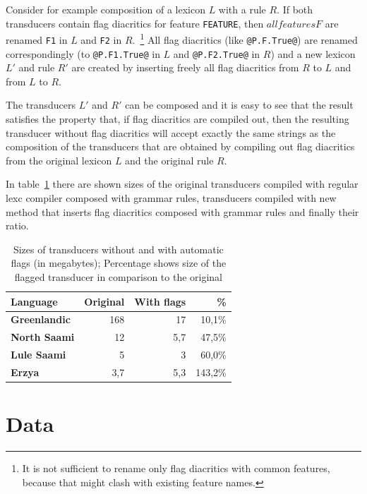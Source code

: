 \documentclass[11pt]{article}
\begin{document}
Consider for example composition of a lexicon $L$ with a rule $R$. If
both transducers contain flag diacritics for feature {\tt FEATURE},
then $all features F$ are renamed {\tt F1} in $L$ and {\tt F2} in
$R$.~\footnote{It is not sufficient to rename only flag diacritics
  with common features, because that might clash with existing feature
  names.} All flag diacritics (like {\tt @P.F.True@}) are renamed
correspondingly (to {\tt @P.F1.True@} in $L$ and {\tt @P.F2.True@} in
$R$) and a new lexicon $L'$ and rule $R'$ are created by inserting
freely all flag diacritics from $R$ to $L$ and from $L$ to $R$.

The transducers $L'$ and $R'$ can be composed and it is easy to
see that the result satisfies the property that, if flag diacritics
are compiled out, then the resulting transducer without flag
diacritics will accept exactly the same strings as the composition of
the transducers that are obtained by compiling out flag diacritics
from the original lexicon $L$ and the original rule $R$.

In table~\ref{table:sizes} there are shown sizes of the original
transducers compiled with regular lexc compiler composed with grammar rules, transducers compiled
with new method that inserts flag diacritics composed with grammar rules and finally their ratio.

\begin{table}
    \centering
    \begin{tabular}{|l|r|r|r|}
        \hline
        \bf Language & \bf Original & \bf With flags & \bf \% \\
        \hline
        \bf Greenlandic &   168   & 17 & 10,1\%  \\
        \bf North Saami &   12     & 5,7 & 47,5\%  \\
        \bf Lule Saami  &   5     & 3 & 60,0\%  \\
        \bf Erzya       &   3,7     & 5,3 & 143,2\%  \\
        \hline
    \end{tabular}
    \caption{Sizes of transducers without and with automatic flags (in megabytes); Percentage shows size of the flagged transducer in comparison to the original
    \label{table:sizes}}
\end{table}




\section{Data}
\label{sec:data}
\end{document}
